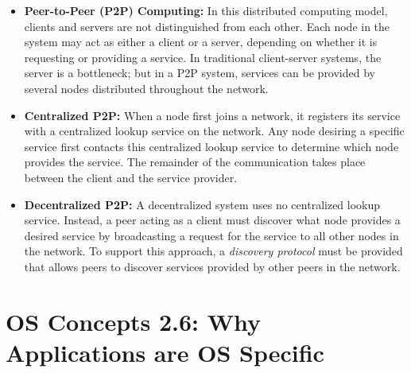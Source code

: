 \documentclass[12pt]{article}
\begin{document}
\begin{itemize}
    \item \textbf{Peer-to-Peer (P2P) Computing:} In this distributed computing model, clients and servers are not distinguished from each other. Each node in the system may act as either a client or a server, depending on whether it is requesting or providing a service. In traditional client-server systems, the server is a bottleneck; but in a P2P system, services can be provided by several nodes distributed throughout the network.
    \item \textbf{Centralized P2P:} When a node first joins a network, it registers its service with a centralized lookup service on the network. Any node desiring a specific service first contacts this centralized lookup service to determine which node provides the service. The remainder of the communication takes place between the client and the service provider.
    \item \textbf{Decentralized P2P:} A decentralized system uses no centralized lookup service. Instead, a peer acting as a client must discover what node provides a desired service by broadcasting a request for the service to all other nodes in the network. To support this approach, a \textit{discovery protocol} must be provided that allows peers to discover services provided by other peers in the network.
\end{itemize}

\section*{OS Concepts 2.6: Why Applications are OS Specific}
\end{document}

